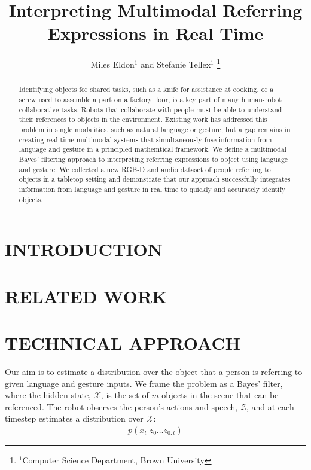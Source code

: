 \documentclass[letterpaper, 10 pt, conference]{ieeeconf}
\title{\LARGE \bf
Interpreting Multimodal Referring Expressions in Real Time}
\author{Miles Eldon$^{1}$ and Stefanie Tellex$^{1}$
\thanks{$^{1}$Computer Science Department, Brown University}
}
\begin{document}
\maketitle
\thispagestyle{empty}
\pagestyle{empty}

\begin{abstract}
Identifying objects for shared tasks, such as a knife for assistance
at cooking, or a screw used to assemble a part on a factory floor, is
a key part of many human-robot collaborative tasks.  Robots that
collaborate with people must be able to understand their references to
objects in the environment.  Existing work has addressed this problem
in single modalities, such as natural language or gesture, but a gap
remains in creating real-time multimodal systems that simultaneously
fuse information from language and gesture in a principled mathemtical
framework.  We define a multimodal Bayes' filtering approach to
interpreting referring expressions to object using language and
gesture.  We collected a new RGB-D and audio dataset of people
referring to objects in a tabletop setting and demonstrate that our
approach successfully integrates information from language and gesture
in real time to quickly and accurately identify objects.
\end{abstract}

\section{INTRODUCTION}

\section{RELATED WORK}


\citep{matuszek12}

\section{TECHNICAL APPROACH}
Our aim is to estimate a distribution over the object that a person is
referring to given language and gesture inputs.  We frame the problem
as a Bayes' filter, where the hidden state, $\mathcal{X}$, is the set
of $m$ objects in the scene that can be referenced. The robot observes the person's actions and
speech, $\mathcal{Z}$, and at each timestep estimates a distribution
over $\mathcal{X}$:
\begin{align}
  p(x_t | z_0 \dots z_{0:t})
\end{align}
\end{document}
